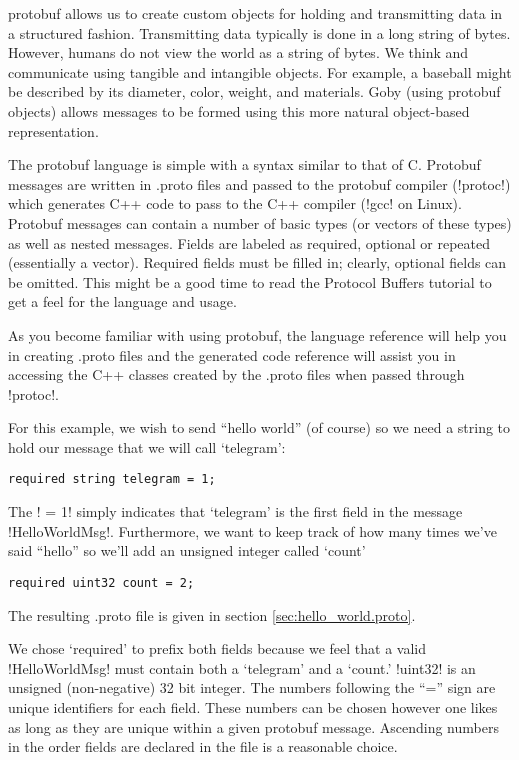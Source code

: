  \gls{protobuf} allows us to create custom objects for holding and transmitting data in a structured fashion. Transmitting data typically is done in a long string of bytes. However, humans do not view the world as a string of bytes. We think and communicate using tangible and intangible objects. For example, a baseball might be described by its diameter, color, weight, and materials. Goby (using protobuf objects) allows messages to be formed using this more natural object-based representation.

The \gls{protobuf} language is simple with a syntax similar to that of C. Protobuf messages are written in .proto files and passed to the protobuf compiler (!protoc!) which generates C++ code to pass to the C++ compiler (!gcc! on Linux). Protobuf messages can contain a number of basic types (or vectors of these types) as well as nested messages. Fields are labeled as required, optional or repeated (essentially a vector). Required fields must be filled in; clearly, optional fields can be omitted. This might be a good time to read the Protocol Buffers tutorial \cite{proto-tutorial} to get a feel for the language and usage.

As you become familiar with using \gls{protobuf}, the language reference \cite{proto-lang-ref} will help you in creating .proto files and the generated code reference \cite{proto-gen-code} will assist you in accessing the C++ classes created by the .proto files when passed through !protoc!.

For this example, we wish to send ``hello world'' (of course) so we need a string to hold our message that we will call `telegram': 
\begin{verbatim}
required string telegram = 1;
\end{verbatim}
The ! = 1! simply indicates that `telegram' is the first field in the message !HelloWorldMsg!. Furthermore, we want to keep track of how many times we've said ``hello'' so we'll add an unsigned integer called `count'
\begin{verbatim}required uint32 count = 2;\end{verbatim}
The resulting .proto file is given in section \ref{sec:hello_world.proto}.

We chose `required' to prefix both fields because we feel that a valid !HelloWorldMsg! must contain both a `telegram' and a `count.' !uint32! is an unsigned (non-negative) 32 bit integer. The numbers following the ``='' sign are unique identifiers for each field. These numbers can be chosen however one likes as long as they are unique within a given protobuf message. Ascending numbers in the order fields are declared in the file is a reasonable choice.

